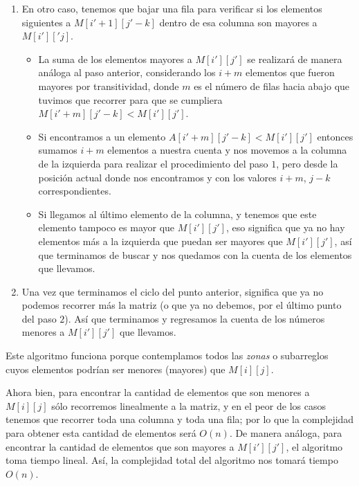 \documentclass[letterpaper,11pt]{article}
\begin{document}
\begin{enumerate}
\begin{enumerate}
\begin{enumerate}
            \item En otro caso, tenemos que bajar una fila para verificar si los
            elementos siguientes a $M[i'+1][j'-k]$ dentro de esa columna son 
            mayores a $M[i']['j]$.
            \begin{itemize}
                \item La suma de los elementos mayores a $M[i'][j']$ se 
                realizará de manera análoga al paso anterior, considerando los 
                $i+m$ elementos que fueron mayores por transitividad, donde 
                $m$ es el número de filas hacia abajo que tuvimos que recorrer 
                para que se cumpliera $M[i'+m][j'-k] < M[i'][j']$.

                \item Si encontramos a un elemento $A[i'+m][j'-k] < M[i'][j']$
                entonces sumamos $i+m$ elementos a nuestra cuenta y nos movemos 
                a la columna de la izquierda para realizar el procedimiento del 
                paso $1$, pero desde la posición actual donde nos encontramos 
                y con los valores $i+m$, $j-k$ correspondientes.

                \item Si llegamos al último elemento de la columna, y tenemos 
                que este elemento tampoco es mayor que $M[i'][j']$, eso 
                significa que ya no hay elementos más a la izquierda que puedan 
                ser mayores que $M[i'][j']$, así que terminamos de buscar y nos 
                quedamos con la cuenta de los elementos que llevamos. 
            \end{itemize}

            \item Una vez que terminamos el ciclo del punto anterior, significa 
            que ya no podemos recorrer más la matriz (o que ya no debemos, por 
            el último punto del paso $2$). Así que terminamos y regresamos la 
            cuenta de los números menores a $M[i'][j']$ que llevamos.
        \end{enumerate}

        Este algoritmo funciona porque contemplamos todos las \textit{zonas} 
        o subarreglos cuyos elementos podrían ser menores (mayores) que 
        $M[i][j]$. 

        Ahora bien, para encontrar la cantidad de elementos que son menores a 
        $M[i][j]$ sólo recorremos linealmente a la matriz, y en el peor de los
        casos tenemos que recorrer toda una columna y toda una fila; por lo que 
        la complejidad para obtener esta cantidad de elementos será $O(n)$. De 
        manera análoga, para encontrar la cantidad de elementos que son mayores 
        a $M[i'][j']$, el algoritmo toma tiempo lineal. Así, la complejidad 
        total del algoritmo nos tomará tiempo $O(n)$.
    \end{enumerate}
    

\end{enumerate}
\end{document}
